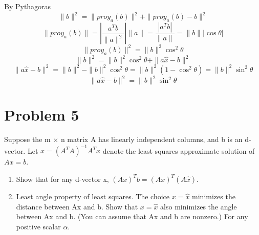 \documentclass[conference, onecolumn]{IEEEtran}
\begin{document}
	By Pythagoras
	\begin{equation}
		\|b\|^2 = \|proy_a(b)\|^2 + \|proy_a(b) - b\|^2
	\end{equation}
	\begin{equation}
		\|proy_a(b)\| = \left| \frac{a^T b}{\|a\|^2} \right| \|a\| = \frac{|a^T b|}{\|a\|} = \|b\| |\cos \theta|
	\end{equation}
	\begin{equation}
		\|proy_a(b)\|^2 = \|b\|^2 \cos^2 \theta
	\end{equation}
	\begin{equation}
		\|b\|^2 = \|b\|^2 \cos^2 \theta + \|a\hat{x} - b\|^2
	\end{equation}
	\begin{equation}
		\|a\hat{x} - b\|^2 = \|b\|^2 - \|b\|^2 \cos^2 \theta = \|b\|^2 (1 - \cos^2 \theta) = \|b\|^2 \sin^2 \theta
	\end{equation}
	\begin{equation}
		\|a\hat{x} - b\|^2 = \|b\|^2 \sin^2 \theta
	\end{equation}
	
	\section*{Problem 5}
	Suppose the m × n matrix A has linearly independent columns, and b is an d-vector. Let $\hat{x} = (A^TA)^{-1}A^Tx$ denote the least squares approximate solution of $Ax = b$.
	\begin{enumerate}
		\item[(a)] Show that for any d-vector x, $(Ax)^Tb=(Ax)^T(A\hat{x})$.
		\item[(b)] Least angle property of least squares. The choice $x = \hat{x}$ minimizes the distance between Ax and b. Show that $x = \hat{x}$ also minimizes the angle between Ax and b. (You can assume that Ax and b are nonzero.) For any positive scalar $\alpha$.
	\end{enumerate}
	
\end{document}

